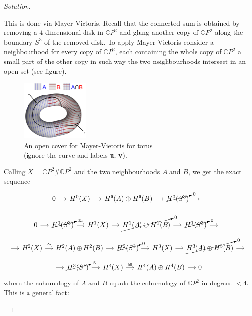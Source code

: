 \begin{proof}[Solution]
\begin{enumerate}[label=\alph*.]
			\iffalse This is done via Mayer-Vietoris. Recall that the connected sum is obtained by removing a 4-dimensional disk in $\mathbb{C}P^{2}$ and glung another copy of $\mathbb{C}P^{2}$ along the boundary $S^3$ of the removed disk. To apply Mayer-Vietoris consider a neighbourhood for every copy of $\mathbb{C}P^{2}$, each containing the whole copy of $\mathbb{C}P^{2}$ a small part of the other copy in such way the two neighbourhoods intersect in an open set (see figure).
			\begin{figure}[H]
				\centering
				\includegraphics[width=0.3\textwidth]{fig1}
				\caption{An open cover for Mayer-Vietoris for torus\\ (ignore the curve and labels \textbf{u}, \textbf{v}).  }
			\end{figure}
			Calling $X=\mathbb{C}P^{2}\#\mathbb{C}P^{2}$ and the two neighbourhoods $A $ and $B$, we get the exact sequence
			\[\begin{tikzcd}[column sep=small]
			0\arrow[r]&H^{0}(X)\arrow[r]&H^{0}(A)\oplus H^{0}(B)\arrow[r]&\cancelto{0}{H^{0}(S^3)}\arrow[r]&\leavevmode
			\end{tikzcd}\]

			\[\begin{tikzcd}[column sep=small]
			0\arrow[r]&	\cancelto{\mathbb{Z}}{H^{0}(S^3)}\arrow[r,"\cong "]&H^{1}(X)\arrow[r]&\cancelto{0}{H^{1}(A)\oplus H^{1}(B)}\arrow[r]&\cancelto{0}{H^{1}(S^3)}\arrow[r]&\leavevmode
			\end{tikzcd}\]
			\[\begin{tikzcd}[column sep=small]
				\leavevmode\arrow[r]&H^{2}(X)\arrow[r,"\cong "]&H^{2}(A)\oplus H^{2}(B)\arrow[r]&\cancelto{0}{H^{2}(S^3)}\arrow[r]&H^{3}(X)\arrow[r]&\cancelto{0}{H^{3}(A)\oplus H^{3}(B)}\arrow[r]&\leavevmode			\end{tikzcd}\]
				\[\begin{tikzcd}[column sep=small]
			\arrow[r]&\cancelto{\mathbb{Z}}{H^{3}(S^3)}\arrow[r]&H^{4}(X)\arrow[r,"\cong "]&H^{4}(A)\oplus H^{4}(B)\arrow[r]&0
				\end{tikzcd}\]
				where the cohomology of $A $ and $ B$ equals the cohomology of $\mathbb{C}P^{2}$ in degrees $<4$. This is a general fact:


\end{enumerate}
\end{proof}
